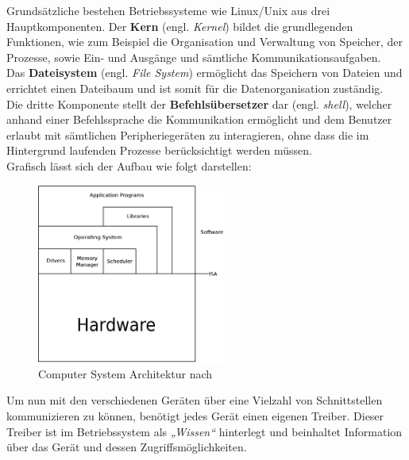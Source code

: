 Grundsätzliche bestehen Betriebssysteme wie Linux/Unix aus drei Hauptkomponenten.
Der \textbf{Kern} (engl. \emph{Kernel}) bildet die grundlegenden Funktionen, wie
zum Beispiel die Organisation und Verwaltung von Speicher, der Prozesse, sowie
Ein- und Ausgänge und sämtliche Kommunikationsaufgaben.\\
Das \textbf{Dateisystem} (engl. \emph{File System}) ermöglicht das Speichern von Dateien
und errichtet einen Dateibaum und ist somit für die Datenorganisation zuständig.\\
Die dritte Komponente stellt der \textbf{Befehlsübersetzer} dar (engl. \emph{shell}),
welcher anhand einer Befehlssprache die Kommunikation ermöglicht und dem Benutzer erlaubt
mit sämtlichen Peripheriegeräten zu interagieren, ohne dass die im Hintergrund laufenden
Prozesse berücksichtigt werden müssen. \cite{ubuntu}\\

Grafisch lässt sich der Aufbau wie folgt darstellen:\\

\begin{figure}[H]
\centering
\includegraphics[width=0.55\textwidth]{Hauptteil/csa.eps}
\caption{Computer System Architektur nach \cite{virtualmachines}}
\label{fig:mbs}
\end{figure}

Um nun mit den verschiedenen Geräten über eine Vielzahl von Schnittstellen kommunizieren
zu können, benötigt jedes Gerät einen eigenen Treiber. Dieser Treiber ist im Betriebssystem
als \emph{„Wissen“} hinterlegt und beinhaltet Information über das Gerät und dessen
Zugriffsmöglichkeiten.~\cite{treiber}\\


